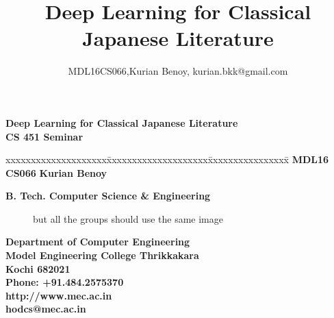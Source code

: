 \documentclass[12pt]{report}
\begin{document}
\renewcommand\bibname{References}
\pagestyle{fancy}
\fancyhead{}
\fancyfoot{}
\fancyfoot[r]{\thepage}
\renewcommand{\chaptermark}[1]{
\markboth{\thechapter.\ #1}{}}
\renewcommand{\headrulewidth}{0.1pt}
\renewcommand{\footrulewidth}{0.1pt}
\fancyhead[r]{\slshape \leftmark}
\addtolength{\headheight}{\baselineskip}
\lhead{\nouppercase{\rightmark}}
\rhead{\nouppercase{\leftmark}}

\graphicspath{ {images/} }

\title {Deep Learning for Classical Japanese Literature }
\author {MDL16CS066,Kurian Benoy, kurian.bkk@gmail.com }

\begin{titlepage}
\begin{center}

\Huge{\textbf{Deep Learning for Classical Japanese Literature}}\\
\vspace{.3in}
\large{\textbf{CS 451 Seminar}}
\vspace{1.0in}

\begin{tabbing}
xxxxxxxxxxxxxxxxxxxx\=xxxxxxxxxxxxxxxxxxxx\= xxxxxxxxxxxxxxxx\=\kill
\Large{\textbf{MDL16 CS066 }}    \>\Large{\textbf{Kurian Benoy}}\\
\end{tabbing}

\Large{\textbf{B. Tech. Computer Science \& Engineering
}}

\vspace{.6in}
\begin{figure}[h]
\begin{center}
but all the groups should use the same image
\end{center}
\end{figure}
\textbf{
Department of Computer  Engineering\\
Model Engineering College Thrikkakara\\
Kochi 682021\\
Phone: +91.484.2575370\\
http://www.mec.ac.in \\ hodcs@mec.ac.in
\vspace{.1in}
}
\end{center}
\end{titlepage}
\end{document}
